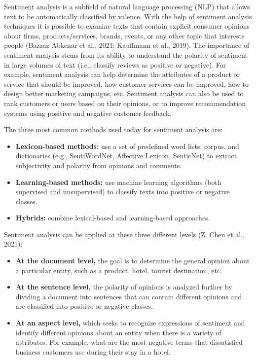 \documentclass[
  letterpaper,
  DIV=11,
  numbers=noendperiod]{scrreprt}
\begin{document}
Sentiment analysis is a subfield of natural language processing (NLP)
that allows text to be automatically classified by valence. With the
help of sentiment analysis techniques it is possible to examine texts
that contain explicit consumer opinions about firms, products/services,
brands, events, or any other topic that interests people (Bazzaz Abkenar
et al., 2021; Kauffmann et al., 2019). The importance of sentiment
analysis stems from its ability to understand the polarity of sentiment
in large volumes of text (i.e., classify reviews as positive or
negative). For example, sentiment analysis can help determine the
attributes of a product or service that should be improved, how customer
services can be improved, how to design better marketing campaigns, etc.
Sentiment analysis can also be used to rank customers or users based on
their opinions, or to improve recommendation systems using positive and
negative customer feedback.

The three most common methods used today for sentiment analysis are:

\begin{itemize}
\item
  \textbf{Lexicon-based methods:} use a set of predefined word lists,
  corpus, and dictionaries (e.g., SentiWordNet, Affective Lexicon,
  SenticNet) to extract subjectivity and polarity from opinions and
  comments.
\item
  \textbf{Learning-based methods:} use machine learning algorithms (both
  supervised and unsupervised) to classify texts into positive or
  negative classes.
\item
  \textbf{Hybrids:} combine lexical-based and learning-based approaches.
\end{itemize}

Sentiment analysis can be applied at these three different levels (Z.
Chen et al., 2021):

\begin{itemize}
\item
  \textbf{At the document level,} the goal is to determine the general
  opinion about a particular entity, such as a product, hotel, tourist
  destination, etc.
\item
  \textbf{At the sentence level,} the polarity of opinions is analyzed
  further by dividing a document into sentences that can contain
  different opinions and are classified into positive or negative
  classes.
\item
  \textbf{At an aspect level,} which seeks to recognize expressions of
  sentiment and identify different opinions about an entity when there
  is a variety of attributes. For example, what are the most negative
  terms that dissatisfied business customers use during their stay in a
  hotel.
\end{itemize}
\end{document}
